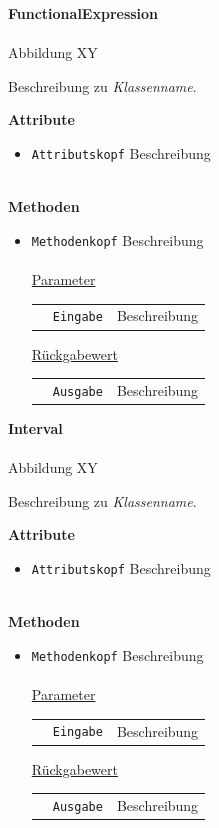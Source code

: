 \documentclass{article}
\begin{document}
\newpage
\textbf{\large{FunctionalExpression}}\\\\
Abbildung XY

Beschreibung zu \textit{Klassenname}.
\newline \newline

\textbf{{Attribute}}
\begin{itemize}
\item \texttt{Attributskopf} \newline Beschreibung
\\\\
\end{itemize}

\textbf{{Methoden}}
\begin{itemize}
\item \texttt{Methodenkopf} \newline Beschreibung
\\\\
\underline{{Parameter}}

\begin{tabular}{lll}
 & \texttt{Eingabe} & Beschreibung \\
\end{tabular}

\underline{{Rückgabewert}}

\begin{tabular}{lll}
 & \texttt{Ausgabe} & Beschreibung \\
\end{tabular}
\end{itemize}


\newpage
\textbf{\large{Interval}}\\\\
Abbildung XY

Beschreibung zu \textit{Klassenname}.
\newline \newline

\textbf{{Attribute}}
\begin{itemize}
\item \texttt{Attributskopf} \newline Beschreibung
\\\\
\end{itemize}

\textbf{{Methoden}}
\begin{itemize}
\item \texttt{Methodenkopf} \newline Beschreibung
\\\\
\underline{{Parameter}}

\begin{tabular}{lll}
 & \texttt{Eingabe} & Beschreibung \\
\end{tabular}

\underline{{Rückgabewert}}

\begin{tabular}{lll}
 & \texttt{Ausgabe} & Beschreibung \\
\end{tabular}
\end{itemize}
\end{document}

